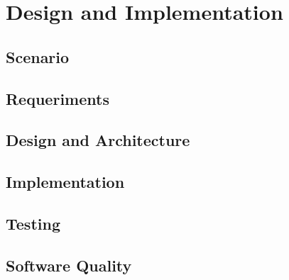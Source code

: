 \chapter{Design and Implementation}
\label{design}


\section{Scenario}
\section{Requeriments}
\section{Design and Architecture}
\section{Implementation}
\section{Testing}
\section{Software Quality}